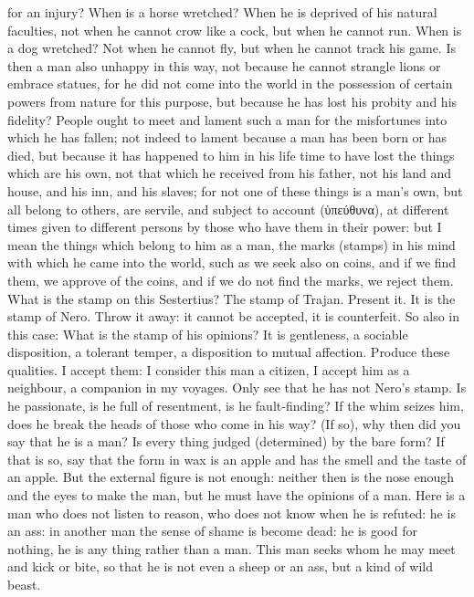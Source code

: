 \documentclass[12pt]{article}
\begin{document}
for an injury? When is a horse wretched? When he is deprived of his natural faculties, not when he cannot crow like a cock, but when he cannot run. When is a dog wretched? Not when he cannot fly, but when he cannot track his game. Is then a man also unhappy in this way, not because he cannot strangle lions or embrace statues, for he did not come into the world in the possession of certain powers from nature for this purpose, but because he has lost his probity and his fidelity? People ought to meet and lament such a man for the misfortunes into which he has fallen; not indeed to lament because a man has been born or has died, but because it has happened to him in his life time to have lost the things which are his own, not that which he received from his father, not his land and house, and his inn, and his slaves; for not one of these things is a man's own, but all belong to others, are servile, and subject to account (ὑπεύθυνα), at different times given to different persons by those who have them in their power: but I mean the things which belong to him as a man, the marks (stamps) in his mind with which he came into the world, such as we seek also on coins, and if we find them, we approve of the coins, and if we do not find the marks, we reject them. What is the stamp on this Sestertius? The stamp of Trajan. Present it. It is the stamp of Nero. Throw it away: it cannot be accepted, it is counterfeit. So also in this case: What is the stamp of his opinions? It is gentleness, a sociable disposition, a tolerant temper, a disposition to mutual affection. Produce these qualities. I accept them: I consider this man a citizen, I accept him as a neighbour, a companion in my voyages. Only see that he has not Nero's stamp. Is he passionate, is he full of resentment, is he fault-finding? If the whim seizes him, does he break the heads of those who come in his way? (If so), why then did you say that he is a man? Is every thing judged (determined) by the bare form? If that is so, say that the form in wax is an apple and has the smell and the taste of an apple. But the external figure is not enough: neither then is the nose enough and the eyes to make the man, but he must have the opinions of a man. Here is a man who does not listen to reason, who does not know when he is refuted: he is an ass: in another man the sense of shame is become dead: he is good for nothing, he is any thing rather than a man. This man seeks whom he may meet and kick or bite, so that he is not even a sheep or an ass, but a kind of wild beast.
\end{document}

